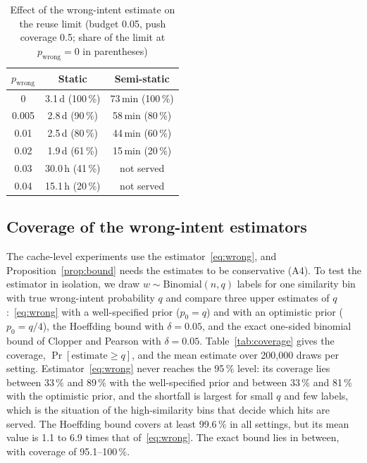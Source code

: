 \documentclass[journal]{IEEEtran}
\newcommand{\pct}{\,\%}
\begin{document}
\begin{table}[!t]
\caption{Effect of the wrong-intent estimate on the reuse limit (budget 0.05, push coverage 0.5; share of the limit at $p_{\text{wrong}}=0$ in parentheses)}
\label{tab:wrongeffect}
\centering\footnotesize
\setlength{\tabcolsep}{3pt}
\begin{tabular}{ccc}
\toprule
$p_{\text{wrong}}$ & Static & Semi-static\\
\midrule
0 & 3.1\,d (100\pct{}) & 73\,min (100\pct{})\\
0.005 & 2.8\,d (90\pct{}) & 58\,min (80\pct{})\\
0.01 & 2.5\,d (80\pct{}) & 44\,min (60\pct{})\\
0.02 & 1.9\,d (61\pct{}) & 15\,min (20\pct{})\\
0.03 & 30.0\,h (41\pct{}) & not served\\
0.04 & 15.1\,h (20\pct{}) & not served\\
\bottomrule
\end{tabular}
\end{table}

\subsection{Coverage of the wrong-intent estimators}\label{sec:coverage}
The cache-level experiments use the estimator~\eqref{eq:wrong}, and Proposition~\ref{prop:bound} needs the estimates to be conservative (A4). To test the estimator in isolation, we draw $w\sim\mathrm{Binomial}(n,q)$ labels for one similarity bin with true wrong-intent probability $q$ and compare three upper estimates of $q$:~\eqref{eq:wrong} with a well-specified prior ($p_0=q$) and with an optimistic prior ($p_0=q/4$), the Hoeffding bound with $\delta=0.05$, and the exact one-sided binomial bound of Clopper and Pearson \cite{clopper1934} with $\delta=0.05$. Table~\ref{tab:coverage} gives the coverage, $\Pr[\text{estimate}\ge q]$, and the mean estimate over 200,000 draws per setting. Estimator~\eqref{eq:wrong} never reaches the 95\pct{} level: its coverage lies between 33\pct{} and 89\pct{} with the well-specified prior and between 33\pct{} and 81\pct{} with the optimistic prior, and the shortfall is largest for small $q$ and few labels, which is the situation of the high-similarity bins that decide which hits are served. The Hoeffding bound covers at least 99.6\pct{} in all settings, but its mean value is 1.1 to 6.9 times that of~\eqref{eq:wrong}. The exact bound lies in between, with coverage of 95.1--100\pct{}.
\end{document}
